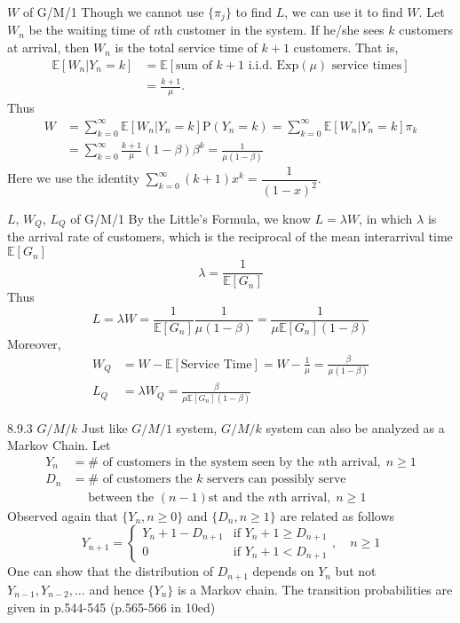 \documentclass[letterpaper,handout]{beamer}
\def\p{\mathrm P}
\def\E{\mathbb E}
\begin{document}
\begin{frame}{$W$ of G/M/1}
Though we cannot use $\{\pi_j\}$ to find $L$, we can use it to find $W$.
Let $W_n$ be the waiting time of $n$th customer in the system.
If he/she sees $k$ customers at arrival, then $W_n$ is the total service time of $k+1$ customers. That is, \begin{align*}
\E[W_n|Y_n=k]&=\E[\mbox{sum of $k+1$ i.i.d. Exp}(\mu)\mbox{ service times}]\\
&=\frac{k+1}{\mu}.
\end{align*}
Thus
\begin{align*}
W &= \sum_{k=0}^{\infty}\E[W_n|Y_n=k]\p(Y_n=k)=\sum_{k=0}^{\infty}\E[W_n|Y_n=k]\pi_k\\
&=\sum_{k=0}^{\infty}\frac{k+1}{\mu}(1-\beta)\beta^k = \frac{1}{\mu(1-\beta)}
\end{align*}
Here we use the identity $\displaystyle\sum_{k=0}^{\infty}(k+1)x^k= \dfrac{1}{(1 - x)^2}.$
\end{frame}
\begin{frame}{$L$, $W_Q$, $L_Q$ of G/M/1}
By the Little's Formula, we know $L=\lambda W$, in which $\lambda$ is the arrival rate of customers, which is the reciprocal of the mean interarrival time $\E[G_n]$
$$\lambda = \frac{1}{\E[G_n]}$$
Thus
$$L=\lambda W = \frac{1}{\E[G_n]}\frac{1}{\mu(1-\beta)}=\frac{1}{\mu\E[G_n](1-\beta)}$$
Moreover,
\begin{align*}
W_Q&=W-\E[\mbox{Service Time}] = W-\frac{1}{\mu}=\frac{\beta}{\mu(1-\beta)}\\
L_Q&=\lambda W_Q = \frac{\beta}{\mu\E[G_n](1-\beta)}
\end{align*}
\end{frame}
\begin{frame}{8.9.3 $G/M/k$}
Just like $G/M/1$ system, $G/M/k$ system can also be analyzed as a Markov Chain. Let
\begin{align*}
Y_n &=\#\mbox{ of customers in the system seen by the $n$th arrival},\; n\ge 1\\
D_n &=\#\mbox{ of customers the $k$ servers can possibly serve}\\
&\quad\mbox{  between the $(n-1)$st and the $n$th arrival},\; n\ge 1
\end{align*}
Observed again that $\{Y_n, n\ge 0\}$ and $\{D_n,n\ge 1\}$ are related as follows
$$
Y_{n+1} = %
\begin{cases}
Y_n+1-D_{n+1} & \mbox{if } Y_n+1\ge D_{n+1}\\
0 & \mbox{if } Y_n+1 < D_{n+1}
\end{cases},\quad n\ge 1
$$
One can show that the distribution of $D_{n+1}$ depends on $Y_n$ but not $Y_{n-1},Y_{n-2},\ldots$
and hence $\{Y_{n}\}$ is a Markov chain. The transition probabilities are given in p.544-545 (p.565-566 in 10ed)
\end{frame}
\end{document}
